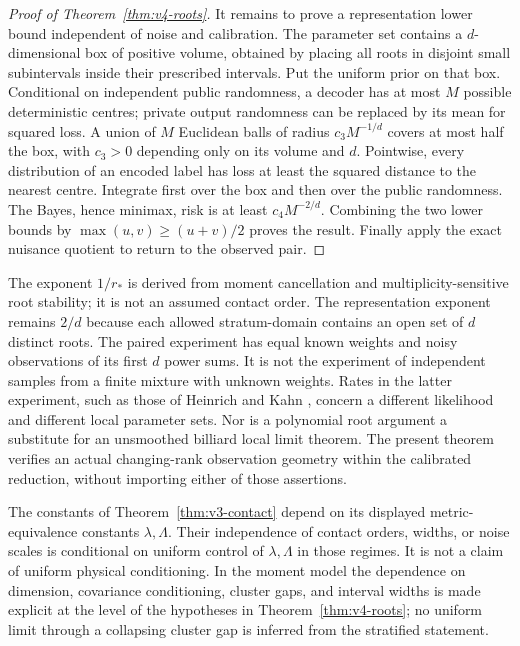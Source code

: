 \begin{proof}[Proof of Theorem~\ref{thm:v4-roots}]
It remains to prove a representation lower bound independent of
noise and calibration. The parameter set contains a $d$-dimensional
box of positive volume, obtained by placing all roots in disjoint
small subintervals inside their prescribed intervals. Put the uniform
prior on that box. Conditional on independent public randomness,
a decoder has at most $M$ possible deterministic centres; private
output randomness can be replaced by its mean for squared loss.
A union of $M$ Euclidean balls of radius
$c_3M^{-1/d}$ covers at most half the box, with $c_3>0$ depending
only on its volume and $d$. Pointwise, every distribution of an
encoded label has loss at least the squared distance to the nearest
centre. Integrate first over the box and then over the public
randomness. The Bayes, hence minimax, risk is at least
$c_4M^{-2/d}$. Combining the two lower bounds by
$\max(u,v)\ge(u+v)/2$ proves the result. Finally apply the exact
nuisance quotient to return to the observed pair.
\end{proof}

\begin{remark}\label{rem:v4-collision-meaning}
The exponent $1/r_*$ is derived from moment cancellation and
multiplicity-sensitive root stability; it is not an assumed contact
order. The representation exponent remains $2/d$ because each
allowed stratum-domain contains an open set of $d$ distinct roots.
The paired experiment has equal known weights and noisy observations
of its first $d$ power sums. It is not the experiment of independent
samples from a finite mixture with unknown weights. Rates in the
latter experiment, such as those of Heinrich and Kahn
\cite{HeinrichKahn2015}, concern a different likelihood and different
local parameter sets. Nor is a polynomial root argument a substitute
for an unsmoothed billiard local limit theorem. The present theorem
verifies an actual changing-rank observation geometry within the
calibrated reduction, without importing either of those assertions.
\end{remark}

\begin{remark}\label{rem:v4-contact-uniformity}
The constants of Theorem~\ref{thm:v3-contact} depend on its displayed
metric-equivalence constants $\lambda,\Lambda$. Their independence
of contact orders, widths, or noise scales is conditional on uniform
control of $\lambda,\Lambda$ in those regimes. It is not a claim of
uniform physical conditioning. In the moment model the dependence
on dimension, covariance conditioning, cluster gaps, and interval
widths is made explicit at the level of the hypotheses in
Theorem~\ref{thm:v4-roots}; no uniform limit through a collapsing
cluster gap is inferred from the stratified statement.
\end{remark}
